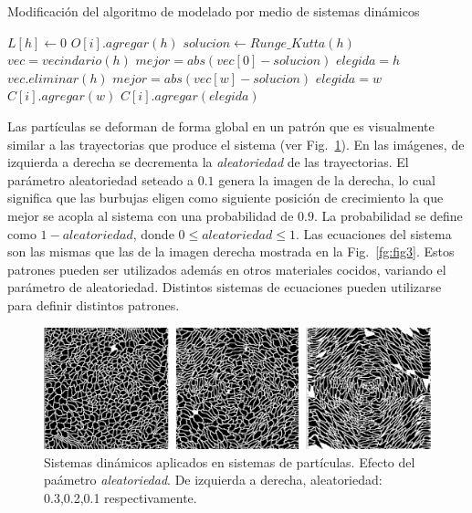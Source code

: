 \documentclass[spanish,a4paper,openright,11pt]{book}
\begin{document}
\begin{algorithm}[h!]
\caption{Modificación del algoritmo de modelado por medio de sistemas dinámicos}
\begin{algorithmic}
\State $L[h]\gets 0$ 
\State $O[i].agregar(h)$
\State $solucion \gets Runge\_Kutta(h)$
\State $vec = vecindario(h)$
\State $mejor = abs(vec[0] - solucion)$
\State $elegida = h$
\State $vec.eliminar(h)$
        \State $mejor = abs(vec[w]-solucion)$
        \State $elegida = w$
    \EndIf
        \State $C[i].agregar(w)$
    \EndIf
\EndFor
{}
\State $C[i].agregar(elegida)$
\end{algorithmic}
\end{algorithm}

Las part\'iculas se deforman de forma global en un patr\'on que es visualmente similar a las trayectorias que produce el sistema (ver Fig.~\ref{fg:sistdin3}). En las im\'agenes, de izquierda a derecha se decrementa la {\em aleatoriedad} de las trayectorias. El par\'ametro aleatoriedad seteado a $0.1$ genera la imagen de la derecha, lo cual significa que las burbujas eligen como siguiente posición de crecimiento la que mejor se acopla al sistema con una probabilidad de $0.9$. La probabilidad se define como $1-aleatoriedad$, donde $0 \leq aleatoriedad \leq 1$. Las ecuaciones del sistema son las mismas que las de la imagen derecha mostrada en la Fig.~\ref{fg:fig3}. Estos patrones pueden ser utilizados adem\'as en otros materiales cocidos, variando el par\'ametro de aleatoriedad. Distintos sistemas de ecuaciones pueden utilizarse para definir distintos patrones.

\begin{figure}[htb!]
  \centerline{\includegraphics[scale=0.21]{sistdin3}}
  \caption{Sistemas din\'amicos aplicados en sistemas de part\'iculas. Efecto del pa\'ametro {\em aleatoriedad}. De izquierda a derecha, aleatoriedad: 0.3,0.2,0.1 respectivamente. }
  \label{fg:sistdin3}
\end{figure}
\end{document}
